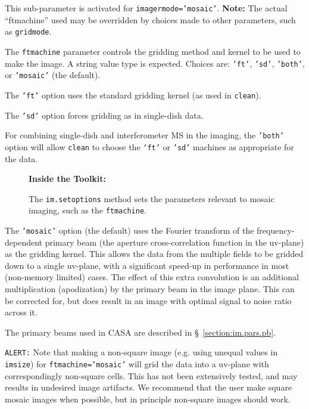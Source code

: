 This sub-parameter is activated for {\tt imagermode='mosaic'}. 
{\bf Note:} The actual ``ftmachine'' used may be overridden by choices
made to other parameters, such as {\tt gridmode}.

The {\tt ftmachine} parameter controls the gridding method and kernel to be
used to make the image.  A string value type is expected.
Choices are: {\tt 'ft'}, {\tt 'sd'}, {\tt 'both'}, or {\tt 'mosaic'} (the default).

The {\tt 'ft'} option uses the standard gridding kernel (as used in 
{\tt clean}).

The {\tt 'sd'} option forces gridding as in single-dish data.

For combining single-dish and interferometer MS in the imaging, the
{\tt 'both'} option will allow {\tt clean} to choose the {\tt `ft'}
or {\tt 'sd'} machines as appropriate for the data.

\begin{wrapfigure}{r}{2.5in}
  \begin{boxedminipage}{2.5in}
     \centerline{\bf Inside the Toolkit:}
     The {\tt im.setoptions} method sets the parameters relevant to
     mosaic imaging, such as the {\tt ftmachine}.
  \end{boxedminipage}
\end{wrapfigure}

The {\tt 'mosaic'} option (the default) uses the Fourier transform of the
frequency-dependent primary beam (the aperture cross-correlation function in the uv-plane) as
the gridding kernel.  This allows the data from the multiple fields to be
gridded down to a single uv-plane, with a significant speed-up in 
performance in most (non-memory limited) cases.  The effect of this extra
convolution is an additional multiplication (apodization) by the primary
beam in the image plane.  This can be corrected for, but does result in
an image with optimal signal to noise ratio across it.

The primary beams used in CASA are described in \S~\ref{section:im.pars.pb}.

{\tt ALERT:} Note that making a non-square image (e.g. using
unequal values in {\tt imsize}) for {\tt ftmachine='mosaic'} will grid 
the data into a uv-plane with correspondingly non-square cells.  This
has not been extensively tested, and may results in undesired image
artifacts.  We recommend that the user make square mosaic images when
possible, but in principle non-square images should work.

